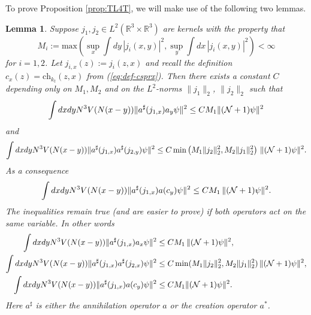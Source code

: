 \documentclass[11pt,a4paper]{article}
\newtheorem{lemma}[thm]{Lemma}
\newcommand{\bR}{{\mathbb R}}
\newcommand{\cN}{{\cal N}}
\begin{document}
To prove Proposition \ref{prop:TL4T}, we will make use of the following two lemmas.
\begin{lemma}\label{lm:4}
Suppose $j_1, j_2 \in L^2 (\bR^3 \times \bR^3)$ are kernels with the property that 
\[ M_i  := \text{max} \left( \sup_x \int dy \, |j_i (x,y)|^2 , \sup_y \int dx \, |j_i (x,y)|^2 \right) < \infty \]
for $i =1 ,2$. Let $j_{i,x} (z) := j_i (z,x)$ and recall the definition $c_x
(z) = \text{ch}_{k_t} (z,x)$ from (\ref{eq:def-csprx}). Then there exists a
constant $C$ depending only on $M_1, M_2$ and on the $L^2$-norms $\| j_1
\|_2$, $\| j_2 \|_2$ such that
\begin{equation}\label{eq:lm4-1}
\int dx dy N^3 V (N (x-y)) \| a^\sharp (j_{1,x}) a_y \psi \|^2 \leq C M_1 \| (\cN+1) \psi \|^2
\end{equation}
and 
\begin{equation}\label{eq:lm4-2}
\int dx dy N^3 V(N (x-y)) \| a^\sharp (j_{1,x}) a^\sharp (j_{2,y}) \psi \|^2 \leq C \min \left(M_1 \| j_2 \|^2_2 , M_2 \| j_1 \|_2^2 \right) \, \| (\cN+1) \psi \|^2 .
\end{equation}
As a consequence
\begin{equation}\label{eq:lm4-3}
\int dx dy N^3 V (N (x-y)) \| a^\sharp (j_{1,x}) a (c_y) \psi \|^2 \leq C M_1 \, \| (\cN+1) \psi \|^2. \end{equation}
The inequalities remain true (and are easier to prove) if both operators act on the same variable. In other words
\begin{equation}\label{eq:lm4-4}
\begin{split}
\int dx dy N^3 V (N (x-y)) \| a^\sharp (j_{1,x}) a_x \psi \|^2 &\leq C M_1
\, \| (\cN+1) \psi \|^2, \\
\int dx dy N^3 V(N (x-y)) \| a^\sharp (j_{1,x}) a^\sharp (j_{2,x}) \psi \|^2
&\leq C \min (M_1 \|j_2 \|_2^2 , M_2 \|j_1\|_2^2 ) \, \| (\cN+1) \psi \|^2, \\
\int dx dy N^3 V (N (x-y)) \| a^\sharp (j_{1,x}) a (c_y) \psi \|^2 &\leq C M_1  \| (\cN+1) \psi \|^2.
\end{split}
\end{equation}
Here $a^\sharp$ is either the annihilation operator $a$ or the creation operator $a^*$. 
\end{lemma}
\end{document}
